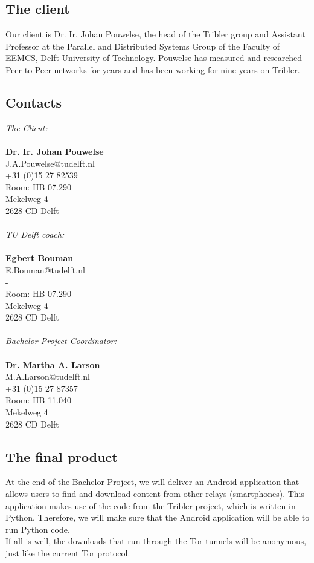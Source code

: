 \subsection{The client}
Our client is Dr. Ir. Johan Pouwelse, the head of the Tribler group and Assistant Professor at the Parallel and Distributed Systems Group of the Faculty of EEMCS, Delft University of Technology. Pouwelse has measured and researched Peer-to-Peer networks for years and has been working for nine years on Tribler.

\subsection{Contacts}

\emph{The Client:}\\\\
\textbf{Dr. Ir. Johan Pouwelse}\\
J.A.Pouwelse@tudelft.nl\\
+31 (0)15 27 82539\\
Room: HB 07.290\\
Mekelweg 4\\
2628 CD Delft\\\\

\emph{TU Delft coach:}\\\\
\textbf{Egbert Bouman}\\
E.Bouman@tudelft.nl\\ 
-\\
Room: HB 07.290\\
Mekelweg 4\\
2628 CD Delft\\\\

\emph{Bachelor Project Coordinator:}\\\\
\textbf{Dr. Martha A. Larson}\\
M.A.Larson@tudelft.nl\\
+31 (0)15 27 87357\\
Room: HB 11.040\\
Mekelweg 4\\
2628 CD Delft\\

\subsection{The final product}
\label{ssec:final-product}
At the end of the Bachelor Project, we will deliver an Android application that allows users to find and download content from other relays (smartphones). This application makes use of the code from the Tribler project, which is written in Python. Therefore, we will make sure that the Android application will be able to run Python code.\\
If all is well, the downloads that run through the Tor tunnels will be anonymous, just like the current Tor protocol.


